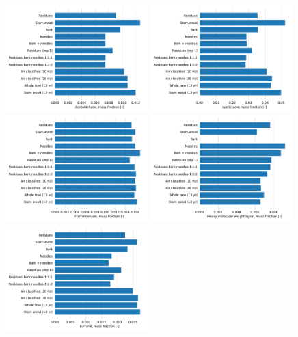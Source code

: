 \begin{figure}[H]
    \centering
    \includegraphics[width=0.49\textwidth]{figures/batch-acetaldehyde.pdf}
    \includegraphics[width=0.49\textwidth]{figures/batch-acetic.pdf}
    \includegraphics[width=0.49\textwidth]{figures/batch-formaldehyde.pdf}
    \includegraphics[width=0.49\textwidth]{figures/batch-heavylignin.pdf}
    \includegraphics[width=0.49\textwidth]{figures/batch-furfural.pdf}

\end{figure}
